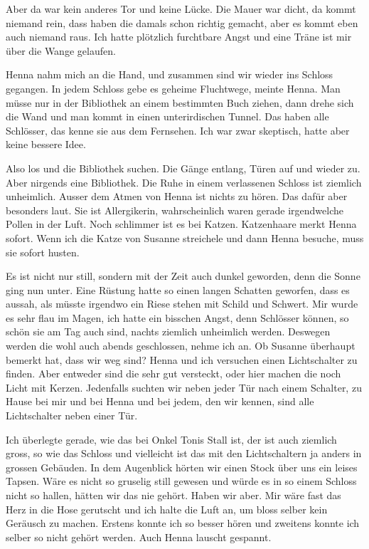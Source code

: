 Aber da war kein anderes Tor und keine Lücke. Die Mauer war dicht, da kommt
niemand rein, dass haben die damals schon richtig gemacht, aber es kommt eben
auch niemand raus. Ich hatte plötzlich furchtbare Angst und eine Träne ist mir
über die Wange gelaufen. 

Henna nahm mich an die Hand, und zusammen sind wir wieder ins Schloss gegangen.
In jedem Schloss gebe es geheime Fluchtwege, meinte Henna. Man müsse nur in der
Bibliothek an einem bestimmten Buch ziehen, dann drehe sich die Wand und man
kommt in einen unterirdischen Tunnel. Das haben alle Schlösser, das kenne sie
aus dem Fernsehen.  Ich war zwar skeptisch, hatte aber keine bessere Idee. 

Also los und die Bibliothek suchen. Die Gänge entlang, Türen auf und wieder zu.
Aber nirgends eine Bibliothek. Die Ruhe in einem verlassenen Schloss ist
ziemlich unheimlich. Ausser dem Atmen von Henna ist nichts zu hören. Das dafür
aber besonders laut. Sie ist Allergikerin, wahrscheinlich waren gerade irgendwelche Pollen in der Luft. Noch schlimmer ist es bei Katzen. Katzenhaare merkt Henna sofort. Wenn ich die Katze von Susanne streichele und dann Henna besuche, muss sie sofort husten.

Es ist nicht nur still, sondern mit der Zeit auch dunkel geworden, denn die Sonne ging nun unter. Eine Rüstung hatte so einen langen Schatten geworfen, dass es aussah, als müsste irgendwo ein Riese stehen mit Schild und Schwert. Mir wurde es sehr flau im Magen, ich hatte ein bisschen Angst, denn Schlösser können, so schön sie am Tag auch sind, nachts ziemlich unheimlich werden. Deswegen werden die wohl auch abends geschlossen, nehme ich an. Ob Susanne überhaupt bemerkt hat, dass wir weg sind? Henna und ich versuchen einen Lichtschalter zu finden. Aber entweder sind die sehr gut versteckt, oder hier machen die noch Licht mit Kerzen. Jedenfalls suchten wir neben jeder Tür nach einem Schalter, zu Hause bei mir und bei Henna und bei jedem, den wir kennen, sind alle Lichtschalter neben einer Tür.

Ich überlegte gerade, wie das bei Onkel Tonis Stall ist, der ist auch ziemlich gross, so wie das Schloss und vielleicht ist das mit den Lichtschaltern ja anders in grossen Gebäuden. In dem Augenblick hörten wir einen Stock über uns ein leises Tapsen. Wäre es nicht so gruselig still gewesen und würde es in so einem Schloss nicht so hallen, hätten wir das nie gehört. Haben wir aber. Mir wäre fast das Herz in die Hose gerutscht und ich halte die Luft an, um bloss selber kein Geräusch zu machen. Erstens konnte ich so besser hören und zweitens konnte ich selber so nicht gehört werden. Auch Henna lauscht gespannt.

